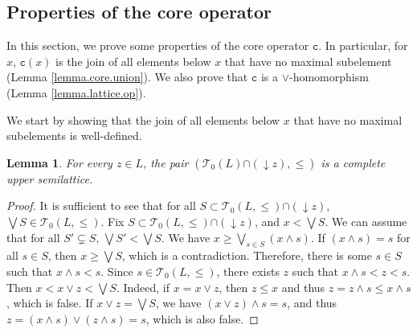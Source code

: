 \documentclass{article}
\newcommand{\blue}{\color{blue}}
\newtheorem{lemma}[theorem]{Lemma}
\begin{document}

\subsection{Properties of the core operator\label{section.core.operator.properties}}

{In this section, we prove some properties of the core operator $\texttt{c}$. In particular, for $x$, $\texttt{c}(x)$ is the join of all elements below $x$ that have no maximal subelement (Lemma \ref{lemma.core.union}). We also prove that $\texttt{c}$ is a $\vee$-homomorphism (Lemma \ref{lemma.lattice.op}).}

{We start by showing that the join of all elements below $x$ that have no maximal subelements is well-defined.}


\begin{lemma}\label{lemma.t0.uppersemilattice}
    {For every $z \in L$,} the pair $(\mathcal{T}_0 (L) {\cap (\mathop{\downarrow}z)}, \le)$ is a complete upper semilattice. 
\end{lemma}

\begin{proof}
    It is sufficient to see that for all $S \subset \mathcal{T}_0(L,\le){ \cap (\mathop{\downarrow}z)}$, $\bigvee S \in \mathcal{T}_0(L,\le)$. Fix $S \subset \mathcal{T}_0(L,\le){\cap (\mathop{\downarrow}z)}$, and $x < \bigvee S$. 
    We can assume that for all $S' \subsetneq S$, $\bigvee S' < \bigvee S$. 
    {We have $x \ge \bigvee_{s \in S}(x \wedge s)$.}
    If $(x \wedge s) = s$ for all $s \in S$, then
    {$x \ge \bigvee S$, which is a contradiction.}
    Therefore, there is some $s \in S$ such that 
    $x \wedge s < s$. Since $s \in \mathcal{T}_0(L,\le)$, there exists $z$ such that $x \wedge s < z < s$. Then $x < x \vee z < \bigvee S$. Indeed, if $x = x \vee z$, then $z \le x$ and thus $z = z \wedge s \le x \wedge s$, which is false. If $x \vee z = \bigvee S$, we have $(x \vee z) \wedge s = s$, and thus $z = (x \wedge s) \vee (z \wedge s) = s$, which is also false.
\end{proof}
\end{document}
